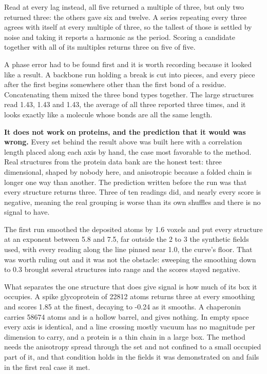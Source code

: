 Read at every lag instead, all five returned a multiple of three, but only two returned three: the others gave six and twelve. A series repeating every three agrees with itself at every multiple of three, so the tallest of those is settled by noise and taking it reports a harmonic as the period. Scoring a candidate together with all of its multiples returns three on five of five.

A phase error had to be found first and it is worth recording because it looked like a result. A backbone run holding a break is cut into pieces, and every piece after the first begins somewhere other than the first bond of a residue. Concatenating them mixed the three bond types together. The large structures read 1.43, 1.43 and 1.43, the average of all three reported three times, and it looks exactly like a molecule whose bonds are all the same length.

\textbf{It does not work on proteins, and the prediction that it would was wrong.} Every set behind the result above was built here with a correlation length placed along each axis by hand, the case most favorable to the method. Real structures from the protein data bank are the honest test: three dimensional, shaped by nobody here, and anisotropic because a folded chain is longer one way than another. The prediction written before the run was that every structure returns three. Three of ten readings did, and nearly every score is negative, meaning the real grouping is worse than its own shuffles and there is no signal to have.

The first run smoothed the deposited atoms by 1.6 voxels and put every structure at an exponent between 5.8 and 7.5, far outside the 2 to 3 the synthetic fields used, with every reading along the line pinned near 1.0, the curve's floor. That was worth ruling out and it was not the obstacle: sweeping the smoothing down to 0.3 brought several structures into range and the scores stayed negative.

What separates the one structure that does give signal is how much of its box it occupies. A spike glycoprotein of 22812 atoms returns three at every smoothing and scores 1.85 at the finest, decaying to -0.24 as it smooths. A chaperonin carries 58674 atoms and is a hollow barrel, and gives nothing. In empty space every axis is identical, and a line crossing mostly vacuum has no magnitude per dimension to carry, and a protein is a thin chain in a large box. The method needs the anisotropy spread through the set and not confined to a small occupied part of it, and that condition holds in the fields it was demonstrated on and fails in the first real case it met.

